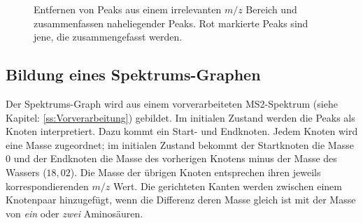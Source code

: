 \documentclass[a4paper, 12pt]{article}
\newcommand{\tikzScale}{1.0}
\newcommand{\massCharge}{$ m/z $ }
\newcommand{\yAxisHeight}{3}
\newcommand{\xAxisLength}{5}
\newcommand{\axisColorOffset}{0.15}
\begin{document}
\begin{figure}[H]
\begin{minipage}[t]{.45\linewidth}
      \end{minipage}
      \caption{Entfernen von Peaks aus einem irrelevanten \massCharge Bereich und zusammenfassen naheliegender Peaks. Rot markierte Peaks sind jene, die zusammengefasst werden.}
\end{figure}

\subsection{Bildung eines Spektrums-Graphen}\label{ss:BildungSpekGraph}
Der Spektrums-Graph wird aus einem vorverarbeiteten MS2-Spektrum (siehe Kapitel: \ref{ss:Vorverarbeitung}) gebildet. Im initialen Zustand werden die Peaks als Knoten interpretiert. Dazu kommt ein Start- und Endknoten. Jedem Knoten wird eine Masse zugeordnet; im initialen Zustand bekommt der Startknoten die Masse 0 und der Endknoten die Masse des vorherigen Knotens minus der Masse des Wassers ($ 18,02 $). Die Masse der übrigen Knoten entsprechen ihren jeweils korrespondierenden \massCharge Wert. Die gerichteten Kanten werden zwischen einem Knotenpaar hinzugefügt, wenn die Differenz deren Masse gleich ist mit der Masse von \emph{ein} oder \emph{zwei} Aminosäuren.
\end{document}
